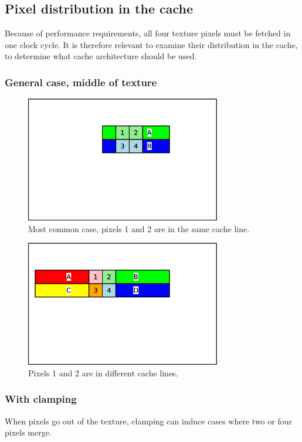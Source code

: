 \documentclass[a4paper,11pt]{article}
\begin{document}
\subsection{Pixel distribution in the cache}
Because of performance requirements, all four texture pixels must be fetched in one clock cycle. It is therefore relevant to examine their distribution in the cache, to determine what cache architecture should be used.

\subsubsection{General case, middle of texture}
\begin{figure}[H]
\centering
\includegraphics[height=55mm]{dist_common.eps}
\caption{Most common case, pixels 1 and 2 are in the same cache line.}\label{fig:case1}
\end{figure}

\begin{figure}[H]
\centering
\includegraphics[height=55mm]{dist_12lines.eps}
\caption{Pixels 1 and 2 are in different cache lines.}\label{fig:case2}
\end{figure}

\subsubsection{With clamping}
When pixels go out of the texture, clamping can induce cases where two or four pixels merge.
\end{document}
